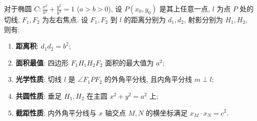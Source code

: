\begin{statementbox}
对于椭圆 $C: \frac{x^2}{a^2} + \frac{y^2}{b^2} = 1$ ($a>b>0$), 设 $P(x_0, y_0)$ 是其上任意一点, $l$ 为点 $P$ 处的切线, $F_1, F_2$ 为左右焦点. 设 $F_1, F_2$ 到 $l$ 的距离分别为 $d_1, d_2$, 射影分别为 $H_1, H_2$, 则有:
\begin{enumerate}
    \item \textbf{距离积}: $d_1 d_2 = b^2$;
    \item \textbf{面积最值}: 四边形 $F_1H_1H_2F_2$ 面积的最大值为 $a^2$;
    \item \textbf{光学性质}: 切线 $l$ 是 $\angle F_1PF_2$ 的外角平分线, 且内角平分线 $m \perp l$;
    \item \textbf{共圆性质}: 垂足 $H_1, H_2$ 在主圆 $x^2 + y^2 = a^2$ 上;
    \item \textbf{截距性质}: 内外角平分线与 $x$ 轴交点 $M, N$ 的横坐标满足 $x_M \cdot x_N = c^2$.
\end{enumerate}
\end{statementbox}